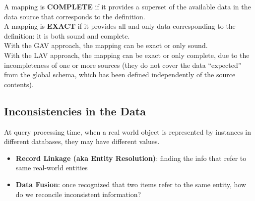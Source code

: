\documentclass[10pt,a4paper]{article}
\begin{document}
A mapping is \textbf{COMPLETE} if it provides a superset of the available data in the data source that corresponds to the definition. \\
A mapping is \textbf{EXACT} if it provides all and only data corresponding to the definition: it is both sound and complete. \\
With the GAV approach, the mapping can be exact or only sound. \\
With the LAV approach, the mapping can be exact or only complete, due to the incompleteness of one or more sources (they do not cover the data “expected” from the global schema, which has been defined independently of the source contents).
\subsection{Inconsistencies in the Data}
At query processing time, when a real world object is represented by instances in different databases, they may have different values.
\begin{itemize}
	\item \textbf{Record Linkage (aka Entity Resolution)}: finding the info that refer to same real-world entities
	\item \textbf{Data Fusion}: once recognized that two items refer to the same entity, how do we reconcile inconsistent information?
\end{itemize}
\end{document}
